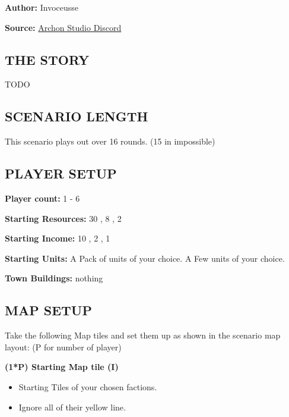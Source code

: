 
\begin{multicols*}{2}

\textbf{Author:} Invoceusse

\textbf{Source:} \href{https://discord.com/channels/740870068178649108/1219333721019256943}{Archon Studio Discord}

\subsection*{\MakeUppercase{The story}}

TODO 

\subsection*{\MakeUppercase{Scenario length}}

This scenario plays out over 16 rounds. (15 in impossible)

\subsection*{\MakeUppercase{Player setup}}

\textbf{Player count:} 1 - 6

\textbf{Starting Resources:} 30 , 8 , 2 

\textbf{Starting Income:} 10 , 2 , 1 

\textbf{Starting Units:} 
    A Pack of  units of your choice.
    A Few  units of your choice.

\textbf{Town Buildings:} nothing

\subsection*{\MakeUppercase{Map setup}}

Take the following Map tiles and set them up as shown in the scenario map layout: (P for number of player)

\textbf{(1*P) Starting Map tile (I)}
\begin{itemize}
    \item Starting Tiles of your chosen factions.
    \item Ignore all of their yellow line.
\end{itemize}


\end{multicols*}
